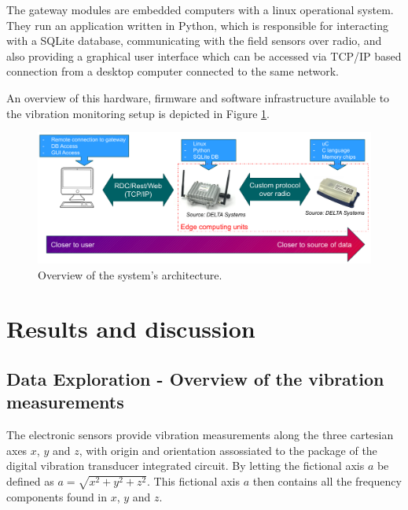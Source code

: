 \documentclass[conference]{IEEEtran}
\begin{document}
The gateway modules are embedded computers with a linux operational system. They run an application written in Python, which is responsible for interacting with a SQLite database, communicating with the field sensors over radio, and also providing a graphical user interface which can be accessed via TCP/IP based connection from a desktop computer connected to the same network.

An overview of this hardware, firmware and software infrastructure available to the vibration monitoring setup is depicted in Figure \ref{concept_pre}.


\begin{figure}[htbp]
\centerline{\includegraphics[width=\columnwidth]{graphics/concept/concept_pre.pdf}}
\caption{Overview of the system's architecture.}
\label{concept_pre}
\end{figure}







\section{Results and discussion}
\label{sec_results_discussion}


\subsection{Data Exploration - Overview of the vibration measurements}

The electronic sensors provide vibration measurements along the three cartesian axes $x$, $y$ and $z$, with origin and orientation assossiated to the package of the digital vibration transducer integrated circuit. By letting the fictional axis $a$ be defined as $a = \sqrt{x^{2}+y^{2}+z^{2}}$. This fictional axis $a$ then contains all the frequency components found in $x$, $y$ and $z$.
\end{document}
